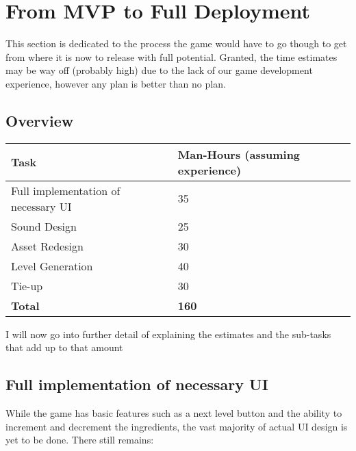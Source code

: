 \documentclass{article}
\begin{document}
\section{From MVP to Full Deployment}

This section is dedicated to the process the game would have to go
though to get from where it is now to release with full
potential. Granted, the time estimates may be way off (probably high)
due to the lack of our game development experience, however any plan is
better than no plan.

\subsection{Overview}

\begin{table}[h]
\begin{tabular}{l|l}
\textbf{Task}                       & \textbf{Man-Hours (assuming experience)} \\ \hline
Full implementation of necessary UI & 35                                                 \\ \hline
Sound Design                        & 25                                                 \\ \hline
Asset Redesign                      & 30                                              \\ \hline
Level Generation                    & 40                                                 \\ \hline
Tie-up                              & 30                                               \\ \hline
\textbf{Total}                      & \textbf{160}                                              \\ 
\end{tabular}
\end{table}

I will now go into further detail of explaining the estimates and the
sub-tasks that add up to that amount

\subsection{Full implementation of necessary UI}

While the game has basic features such as a next level button and the
ability to increment and decrement the ingredients, the vast majority
of actual UI design is yet to be done. There still remains:
\end{document}
